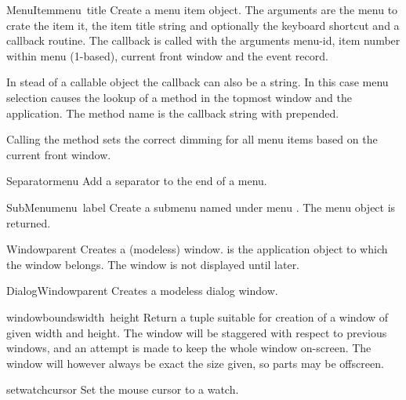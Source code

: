 \begin{funcdesc}{MenuItem}{menu\, title}
Create a menu item object. The arguments are the menu to crate the
item it, the item title string and optionally the keyboard shortcut
and a callback routine. The callback is called with the arguments
menu-id, item number within menu (1-based), current front window and
the event record.

In stead of a callable object the callback can also be a string. In
this case menu selection causes the lookup of a method in the topmost
window and the application. The method name is the callback string
with  prepended.

Calling the   method sets the
correct dimming for all menu items based on the current front window.
\end{funcdesc}

\begin{funcdesc}{Separator}{menu}
Add a separator to the end of a menu.
\end{funcdesc}

\begin{funcdesc}{SubMenu}{menu\, label}
Create a submenu named  under menu . The menu
object is returned.
\end{funcdesc}

\begin{funcdesc}{Window}{parent}
Creates a (modeless) window.  is the application object to
which the window belongs. The window is not displayed until later.
\end{funcdesc}

\begin{funcdesc}{DialogWindow}{parent}
Creates a modeless dialog window.
\end{funcdesc}

\begin{funcdesc}{windowbounds}{width\, height}
Return a  tuple suitable for creation
of a window of given width and height. The window will be staggered
with respect to previous windows, and an attempt is made to keep the
whole window on-screen. The window will however always be exact the
size given, so parts may be offscreen.
\end{funcdesc}

\begin{funcdesc}{setwatchcursor}{}
Set the mouse cursor to a watch.
\end{funcdesc}

